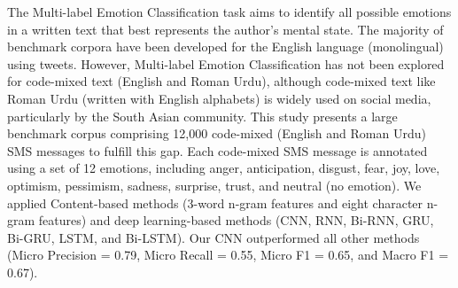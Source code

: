 The Multi-label Emotion Classification task aims to identify all possible emotions in a written text that best represents the author's mental state. The majority of benchmark corpora have been developed for the English language (monolingual) using tweets. However, Multi-label Emotion Classification has not been explored for code-mixed text (English and Roman Urdu), although code-mixed text like Roman Urdu (written with English alphabets) is widely used on social media, particularly by the South Asian community. This study presents a large benchmark corpus comprising 12,000 code-mixed (English and Roman Urdu) SMS messages to fulfill this gap. Each code-mixed SMS message is annotated using a set of 12 emotions, including anger, anticipation, disgust, fear, joy, love, optimism, pessimism, sadness, surprise, trust, and neutral (no emotion). We applied Content-based methods (3-word n-gram features and eight character n-gram features) and deep learning-based methods (CNN, RNN, Bi-RNN, GRU, Bi-GRU, LSTM, and Bi-LSTM). Our CNN outperformed all other methods (Micro Precision = 0.79, Micro Recall = 0.55, Micro F1 = 0.65, and Macro F1 = 0.67).
